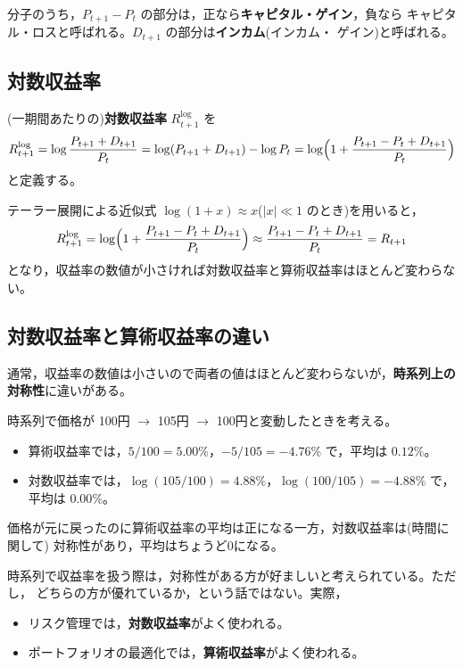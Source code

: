 分子のうち，$P_{t+1} - P_t$ の部分は，正なら\textbf{キャピタル・ゲイン}，負なら
キャピタル・ロスと呼ばれる。$D_{t+1}$ の部分は\textbf{インカム}(インカム・
ゲイン)と呼ばれる。

\subsection{対数収益率}

\begin{definition}[対数収益率]
(一期間あたりの)\textbf{対数収益率} $R^{\log}_{t+1}$ を
\begin{equation}
R^{\log}_{t+1} = \log\frac{P_{t+1}+D_{t+1}}{P_t}
= \log(P_{t+1}+D_{t+1}) - \log P_t
= \log\Bigl(1 + \frac{P_{t+1}-P_t+D_{t+1}}{P_t}\Bigr)
\label{eq:log-return}
\end{equation}
と定義する。
\end{definition}

テーラー展開による近似式 $\log(1+x) \approx x$($|x| \ll 1$ のとき)を用いると，
\begin{equation}
R^{\log}_{t+1} = \log\Bigl(1 + \frac{P_{t+1}-P_t+D_{t+1}}{P_t}\Bigr)
\approx \frac{P_{t+1}-P_t+D_{t+1}}{P_t} = R_{t+1}
\end{equation}
となり，収益率の数値が小さければ対数収益率と算術収益率はほとんど変わらない。

\subsection{対数収益率と算術収益率の違い}

通常，収益率の数値は小さいので両者の値はほとんど変わらないが，\textbf{時系列上の
対称性}に違いがある。

\begin{example}
時系列で価格が 100円 $\to$ 105円 $\to$ 100円と変動したときを考える。
\begin{itemize}
\item 算術収益率では，$5/100 = 5.00\%$，$-5/105 = -4.76\%$ で，平均は $0.12\%$。
\item 対数収益率では，$\log(105/100) = 4.88\%$，$\log(100/105) = -4.88\%$ で，
平均は $0.00\%$。
\end{itemize}
価格が元に戻ったのに算術収益率の平均は正になる一方，対数収益率は(時間に関して)
対称性があり，平均はちょうど0になる。
\end{example}

時系列で収益率を扱う際は，対称性がある方が好ましいと考えられている。ただし，
どちらの方が優れているか，という話ではない。実際，
\begin{itemize}
\item リスク管理では，\textbf{対数収益率}がよく使われる。
\item ポートフォリオの最適化では，\textbf{算術収益率}がよく使われる。
\end{itemize}

